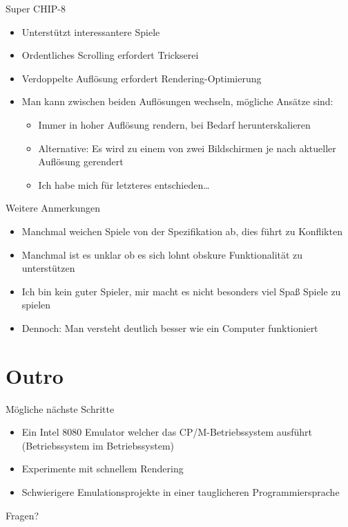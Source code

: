 \documentclass[presentation]{beamer}
\begin{document}
\begin{frame}[label={sec:org6b769e7}]{Super CHIP-8}
\begin{itemize}
\item Unterstützt interessantere Spiele
\item Ordentliches Scrolling erfordert Trickserei
\item Verdoppelte Auflösung erfordert Rendering-Optimierung
\item Man kann zwischen beiden Auflösungen wechseln, mögliche Ansätze
sind:
\begin{itemize}
\item Immer in hoher Auflösung rendern, bei Bedarf herunterskalieren
\item Alternative: Es wird zu einem von zwei Bildschirmen je nach
aktueller Auflösung gerendert
\item Ich habe mich für letzteres entschieden\ldots{}
\end{itemize}
\end{itemize}
\end{frame}

\begin{frame}[label={sec:org43b1ad3}]{Weitere Anmerkungen}
\begin{itemize}
\item Manchmal weichen Spiele von der Spezifikation ab, dies führt zu
Konflikten
\item Manchmal ist es unklar ob es sich lohnt obskure Funktionalität zu
unterstützen
\item Ich bin kein guter Spieler, mir macht es nicht besonders viel Spaß
Spiele zu spielen
\item Dennoch: Man versteht deutlich besser wie ein Computer funktioniert
\end{itemize}
\end{frame}

\section{Outro}
\label{sec:org8526e0d}

\begin{frame}[label={sec:orgf67d7fa}]{Mögliche nächste Schritte}
\begin{itemize}
\item Ein Intel 8080 Emulator welcher das CP/M-Betriebssystem ausführt
(Betriebssystem im Betriebssystem)
\item Experimente mit schnellem Rendering
\item Schwierigere Emulationsprojekte in einer tauglicheren
Programmiersprache
\end{itemize}
\end{frame}

\begin{frame}[label={sec:org19ba262}]{Fragen?}
\end{frame}
\end{document}
